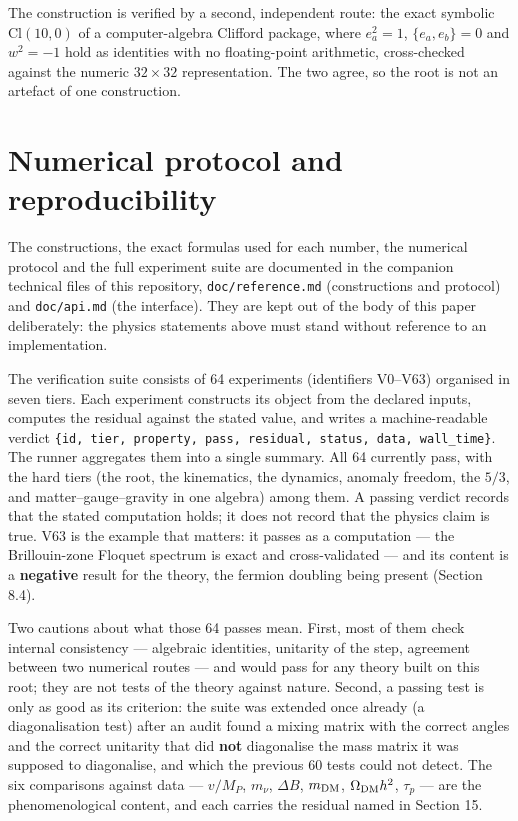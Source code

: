\documentclass[aps,prd,twocolumn,amsmath,amssymb,superscriptaddress,nofootinbib,floatfix]{revtex4-2}
\begin{document}
The construction is verified by a second, independent route: the exact
symbolic \(\mathrm{Cl}(10,0)\) of a computer-algebra Clifford package,
where \(e_a^2 = 1\), \(\{e_a,e_b\} = 0\) and \(w^2 = -1\) hold as
identities with no floating-point arithmetic, cross-checked against the
numeric \(32\times32\) representation. The two agree, so the root is not
an artefact of one construction.

\appendix

\section{Numerical protocol and
reproducibility}\label{numerical-protocol-and-reproducibility}

The constructions, the exact formulas used for each number, the
numerical protocol and the full experiment suite are documented in the
companion technical files of this repository, \texttt{doc/reference.md}
(constructions and protocol) and \texttt{doc/api.md} (the interface).
They are kept out of the body of this paper deliberately: the physics
statements above must stand without reference to an implementation.

The verification suite consists of 64 experiments (identifiers V0--V63)
organised in seven tiers. Each experiment constructs its object from the
declared inputs, computes the residual against the stated value, and
writes a machine-readable verdict
\texttt{\{id,\ tier,\ property,\ pass,\ residual,\ status,\ data,\ wall\_time\}}.
The runner aggregates them into a single summary. All 64 currently pass,
with the hard tiers (the root, the kinematics, the dynamics, anomaly
freedom, the \(5/3\), and matter--gauge--gravity in one algebra) among
them. A passing verdict records that the stated computation holds; it
does not record that the physics claim is true. V63 is the example that
matters: it passes as a computation --- the Brillouin-zone Floquet
spectrum is exact and cross-validated --- and its content is a
\textbf{negative} result for the theory, the fermion doubling being
present (Section 8.4).

Two cautions about what those 64 passes mean. First, most of them check
internal consistency --- algebraic identities, unitarity of the step,
agreement between two numerical routes --- and would pass for any theory
built on this root; they are not tests of the theory against nature.
Second, a passing test is only as good as its criterion: the suite was
extended once already (a diagonalisation test) after an audit found a
mixing matrix with the correct angles and the correct unitarity that did
\textbf{not} diagonalise the mass matrix it was supposed to diagonalise,
and which the previous 60 tests could not detect. The six comparisons
against data --- \(v/M_P\), \(m_\nu\), \(\Delta B\), \(m_{\rm DM}\),
\(\Omega_{\rm DM}h^2\), \(\tau_p\) --- are the phenomenological content,
and each carries the residual named in Section 15.
\end{document}
